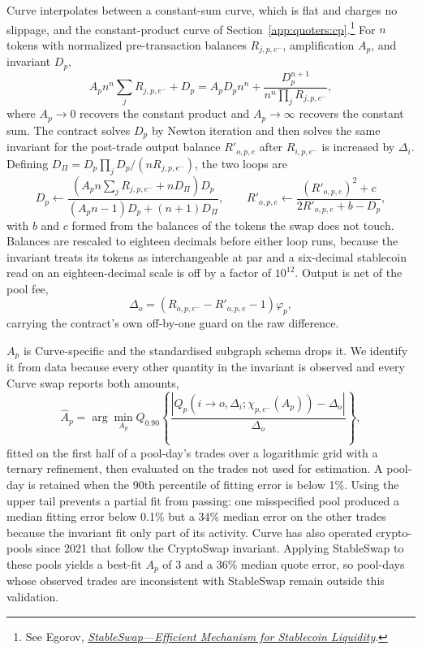 Curve interpolates between a constant-sum curve, which is flat and charges no slippage, and the constant-product curve of Section~\ref{app:quoters:cp}.\footnote{See Egorov, \href{https://docs.curve.finance/assets/pdf/whitepaper_stableswap.pdf}{\emph{StableSwap---Efficient Mechanism for Stablecoin Liquidity}}.} For $n$ tokens with normalized pre-transaction balances $R_{j,p,e^-}$, amplification $A_p$, and invariant $D_p$,
\[
A_p n^{n}\sum_jR_{j,p,e^-}+D_p=A_pD_pn^{n}+\frac{D_p^{n+1}}{n^{n}\prod_jR_{j,p,e^-}},
\]
where $A_p\to0$ recovers the constant product and $A_p\to\infty$ recovers the constant sum. The contract solves $D_p$ by Newton iteration and then solves the same invariant for the post-trade output balance $R'_{o,p,e}$ after $R_{i,p,e^-}$ is increased by $\Delta_i$. Defining $D_{\Pi}=D_p\prod_jD_p/(nR_{j,p,e^-})$, the two loops are
\[
D_p\leftarrow\frac{(A_pn\sum_jR_{j,p,e^-}+nD_{\Pi})D_p}{(A_pn-1)D_p+(n+1)D_{\Pi}},
\qquad
R'_{o,p,e}\leftarrow\frac{(R'_{o,p,e})^2+c}{2R'_{o,p,e}+b-D_p},
\]
with $b$ and $c$ formed from the balances of the tokens the swap does not touch. Balances are rescaled to eighteen decimals before either loop runs, because the invariant treats its tokens as interchangeable at par and a six-decimal stablecoin read on an eighteen-decimal scale is off by a factor of $10^{12}$. Output is net of the pool fee,
\[
\Delta_o=(R_{o,p,e^-}-R'_{o,p,e}-1)\varphi_p,
\]
carrying the contract's own off-by-one guard on the raw difference.

$A_p$ is Curve-specific and the standardised subgraph schema drops it. We identify it from data because every other quantity in the invariant is observed and every Curve swap reports both amounts,
\[
\widehat A_p=\arg\min_{A_p}Q_{0.90}\!\left\{
\frac{|Q_p(i\to o,\Delta_i;\chi_{p,e^-}(A_p))-\Delta_o|}{\Delta_o}
\right\},
\]
fitted on the first half of a pool-day's trades over a logarithmic grid with a ternary refinement, then evaluated on the trades not used for estimation. A pool-day is retained when the 90th percentile of fitting error is below 1\%. Using the upper tail prevents a partial fit from passing: one misspecified pool produced a median fitting error below 0.1\% but a 34\% median error on the other trades because the invariant fit only part of its activity. Curve has also operated crypto-pools since 2021 that follow the CryptoSwap invariant. Applying StableSwap to these pools yields a best-fit $A_p$ of 3 and a 36\% median quote error, so pool-days whose observed trades are inconsistent with StableSwap remain outside this validation.

